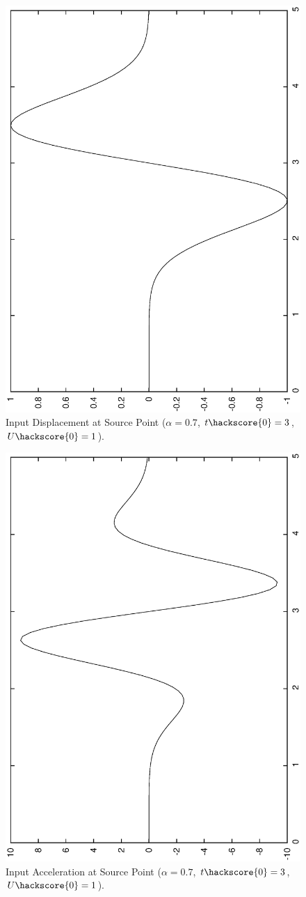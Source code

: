 \begin{figure}[t!]
\centerline{\includegraphics[angle=-90,width=4.in]{figures/waveu}}
\caption{Input Displacement at Source Point ($\alpha=0.7$, $t\hackscore{0}=3$, $U\hackscore{0}=1$).}
\label{WAVE FIG 1.2}
\end{figure}

\begin{figure}[t!]
\centerline{\includegraphics[angle=-90,width=4.in]{figures/wavea}}
\caption{Input Acceleration at Source Point ($\alpha=0.7$, $t\hackscore{0}=3$, $U\hackscore{0}=1$).}
\label{WAVE FIG 1.1}
\end{figure}

